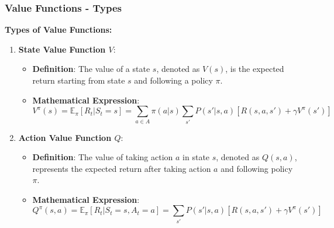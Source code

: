 \documentclass[aspectratio=169]{beamer}
\begin{document}
\begin{frame}[fragile]
    \frametitle{Value Functions - Types}
    
    \textbf{Types of Value Functions:}
    
    \begin{enumerate}
        \item \textbf{State Value Function \(V\)}:
            \begin{itemize}
                \item \textbf{Definition}: The value of a state \(s\), denoted as \(V(s)\), is the expected return starting from state \(s\) and following a policy \(\pi\).
                \item \textbf{Mathematical Expression}:
                \begin{equation}
                    V^\pi(s) = \mathbb{E}_\pi \left[ R_t | S_t = s \right] = \sum_{a \in A} \pi(a|s) \sum_{s'} P(s'|s,a) \left[ R(s,a,s') + \gamma V^\pi(s') \right]
                \end{equation}
            \end{itemize}
        
        \item \textbf{Action Value Function \(Q\)}:
            \begin{itemize}
                \item \textbf{Definition}: The value of taking action \(a\) in state \(s\), denoted as \(Q(s,a)\), represents the expected return after taking action \(a\) and following policy \(\pi\).
                \item \textbf{Mathematical Expression}:
                \begin{equation}
                    Q^\pi(s, a) = \mathbb{E}_\pi \left[ R_t | S_t = s, A_t = a \right] = \sum_{s'} P(s'|s,a) \left[ R(s,a,s') + \gamma V^\pi(s') \right]
                \end{equation}
            \end{itemize}
    \end{enumerate}
\end{frame}
\end{document}
